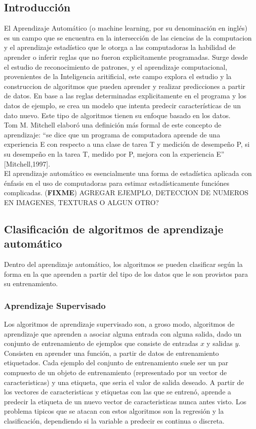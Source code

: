 \documentclass[a4paper,11pt,spanish]{book}
\newcommand*{\FIXME}[1]{{(\textbf{FIXME}) {#1}}}
\begin{document}
    \subsection{Introducción}
      El Aprendizaje Automático (o machine learning, por su denominación en
      inglés) es un campo que se encuentra en la intersección de las ciencias de la computacion y el aprendizaje estadístico que le otorga a las computadoras la habilidad de aprender o inferir reglas que no fueron explicitamente programadas.
      Surge desde el estudio de reconocimiento de patrones, y el aprendizaje computacional, provenientes de la Inteligencia aritificial, este campo explora el estudio y la construccion de algoritmos
      que pueden aprender y realizar predicciones a partir de datos. En base a las reglas determinadas explicitamente en el programa y los datos de ejemplo, se crea un modelo que intenta predecir
      características de un dato nuevo. Este tipo de algoritmos tienen su enfoque basado en los datos.\\
      Tom M. Mitchell elaboró una definición más formal de este concepto de aprendizaje: “se dice que un programa de computadora aprende de una experiencia E con respecto a una clase
      de tarea T y medición de desempeño P, si su desempeño en la tarea T, medido por P, mejora con la experiencia E” [Mitchell,1997].\\
      El aprendizaje automático es esencialmente una forma de estadística aplicada con énfasis en el uso de computadoras para estimar estadísticamente funciónes complicadas.
      \FIXME{AGREGAR EJEMPLO, DETECCION DE NUMEROS EN IMAGENES, TEXTURAS O ALGUN OTRO?}

    \subsection{Clasificación de algoritmos de aprendizaje automático}
      Dentro del aprendizaje automático, los algoritmos se pueden clasificar
      según la forma en la que aprenden a partir del tipo de los datos que le son provistos para su entrenamiento.

      \subsubsection{Aprendizaje Supervisado}
	Los algoritmos de aprendizaje supervisado son, a groso modo, algoritmos de aprendizaje que aprenden a asociar alguna entrada con alguna salida,
	dado un conjunto de entrenamiento de ejemplos que consiste de entradas $x$ y salidas $y$.
	Consisten en aprender una función, a partir de datos de entrenamiento etiquetados. Cada ejemplo del conjunto de entrenamiento suele ser un par
	compuesto de un objeto de entrenamiento (representado por un vector de caracteristicas) y una etiqueta, que seria el valor de salida deseado.
	A partir de los vectores de caracteristicas y etiquetas con las que se entrenó, aprende a predecir la etiqueta de un nuevo vector de caracteristicas nunca antes visto.
	Los problema tipicos que se atacan con estos algoritmos son la regresión y la clasificación, dependiendo si la variable a predecir es continua o discreta.
\end{document}
